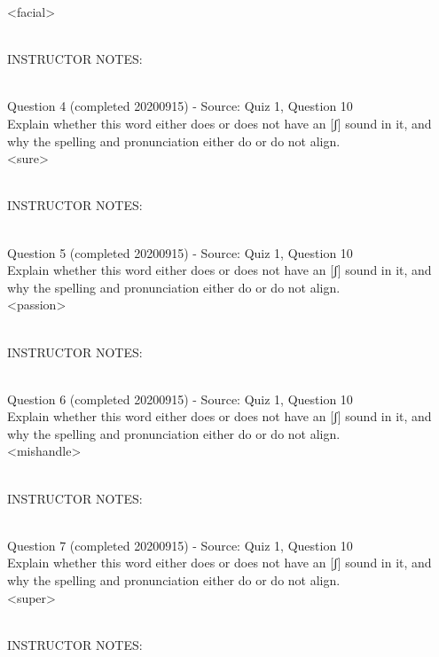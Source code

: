 \documentclass[12pt]{article}
\begin{document}
<facial>


~\\
INSTRUCTOR NOTES: 


~\\

{\large Question 4} (completed 20200915) - Source: Quiz 1, Question 10\\

Explain whether this word either does or does not have an [ʃ] sound in it, and why the spelling and pronunciation either do or do not align.\\

<sure>


~\\
INSTRUCTOR NOTES: 


~\\

{\large Question 5} (completed 20200915) - Source: Quiz 1, Question 10\\

Explain whether this word either does or does not have an [ʃ] sound in it, and why the spelling and pronunciation either do or do not align.\\

<passion>


~\\
INSTRUCTOR NOTES: 


~\\

{\large Question 6} (completed 20200915) - Source: Quiz 1, Question 10\\

Explain whether this word either does or does not have an [ʃ] sound in it, and why the spelling and pronunciation either do or do not align.\\

<mishandle>


~\\
INSTRUCTOR NOTES: 


~\\

{\large Question 7} (completed 20200915) - Source: Quiz 1, Question 10\\

Explain whether this word either does or does not have an [ʃ] sound in it, and why the spelling and pronunciation either do or do not align.\\

<super>


~\\
INSTRUCTOR NOTES: 
\end{document}
